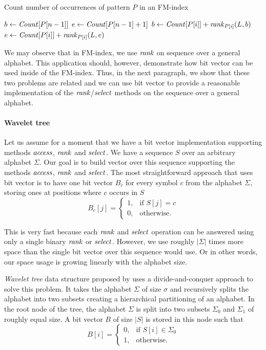 \begin{algorithm}
\caption{Count number of occurrences of pattern $P$ in an FM-index}\label{alg:fm_index_count}
$b \gets \mathit{Count}[P[n-1]]$\;
$e \gets \mathit{Count}[P[n-1]+1]$\;
 {
	$b \gets \mathit{Count}[P[i]] + \mathit{rank}_{P[i]}(L, b)$\;
	$e \gets \mathit{Count}[P[i]] + \mathit{rank}_{P[i]}(L, e)$\;
}
\end{algorithm}

We may observe that in FM-index, we use $\mathit{rank}$ on sequence over a general alphabet. This application
should, however, demonstrate how bit vector can be used inside of the FM-index. Thus, in the next
paragraph, we show that these two problems are related and we can use bit vector to provide a
reasonable implementation of the $\mathit{rank}$/$\mathit{select}$ methods on the sequence over a general alphabet.

\paragraph{Wavelet tree}
\label{section:WaweletTree}

Let us assume for a moment that we have a bit vector implementation supporting methods $\mathit{access}$,
$\mathit{rank}$ and $\mathit{select}$. We have a sequence $S$ over an arbitrary alphabet $\Sigma$. Our goal is to
build vector over this sequence supporting the methods $\mathit{access}$, $\mathit{rank}$ and $\mathit{select}$. The most
straightforward approach that uses bit vector is to have one bit vector $B_c$ for every symbol $c$
from the alphabet $\Sigma$, storing ones at positions where $c$ occurs in $S$
\[
    B_c[j]= 
\begin{cases}
	1,& \text{if } S[j]=c \\
    0,& \text{otherwise.}
\end{cases}
\]

This is very fast because each $\mathit{rank}$ and $\mathit{select}$ operation can be answered using only a single
binary $\mathit{rank}$ or $\mathit{select}$. However, we use roughly $|\Sigma|$ times more space than the single bit
vector over this sequence would use. Or in other words, our space usage is growing linearly with the
alphabet size.

\textit{Wavelet tree} data structure proposed by \cite{grossi2003high} uses a divide-and-conquer
approach to solve this problem. It takes the alphabet $\Sigma$ of size $\sigma$ and recursively
splits the alphabet into two subsets creating a hierarchical partitioning of an alphabet. In the
root node of the tree, the alphabet $\Sigma$ is split into two subsets $\Sigma_0$ and $\Sigma_1$
of roughly equal size. A bit vector $B$ of size $|S|$ is stored in this node such that
\[
    B[i]= 
\begin{cases}
    0,& \text{if } S[i]\in \Sigma_0\\
    1,              & \text{otherwise.}
\end{cases}
\]

